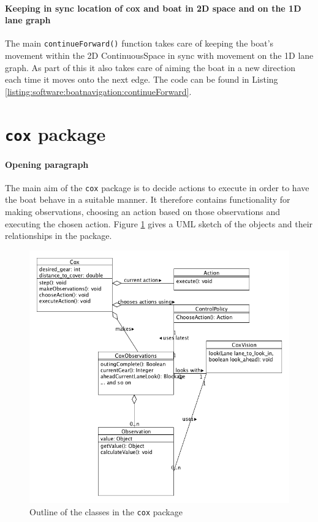 \paragraph{Keeping in sync location of cox and boat in 2D space and on the 1D lane graph}
The main \texttt{continueForward()} function takes care of keeping the
boat's movement within the 2D ContinuousSpace in sync with
movement on the 1D lane graph. As part of this it also takes care of
aiming the boat in a new direction each time it moves onto the next
edge. The code can be found in Listing \ref{listing:software:boatnavigation:continueForward}.



\section{\texttt{cox} package}
\paragraph{Opening paragraph}
The main aim of the \texttt{cox} package is to decide actions to execute in order to have the boat behave in a suitable manner. It therefore contains functionality for making observations, choosing an action based on those observations and executing the chosen action. Figure \ref{software:fig:coxUML} gives a UML sketch of the objects and their relationships in the package.

\begin{figure}
\begin{center}
  \includegraphics[scale=0.3]{images/coxpackageUML.png}
  \caption{Outline of the classes in the \texttt{cox} package}
  \label{software:fig:coxUML}
\end{center}
\end{figure}

